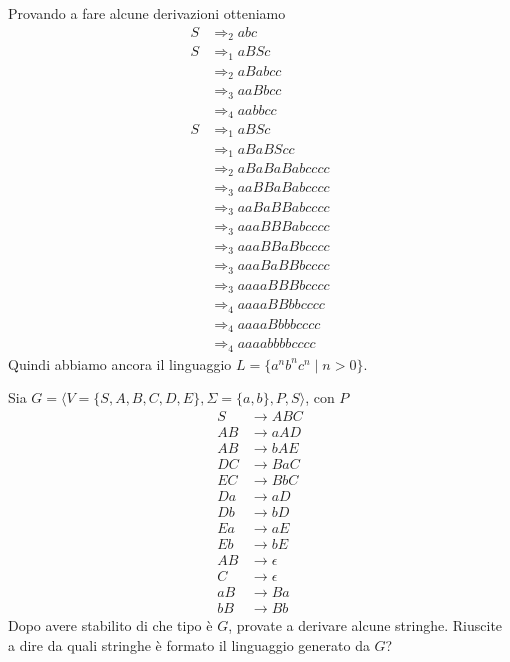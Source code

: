 \documentclass[12pt, answers]{exam}
\begin{document}
\begin{questions}
\begin{solution}
		Provando a fare alcune derivazioni otteniamo
		\begin{align*}
			S &\Rightarrow_2 a b c \\
			S &\Rightarrow_1 a B S c \\
			  &\Rightarrow_2 a B a b c c \\
			  &\Rightarrow_3 a a B b c c \\
			  &\Rightarrow_4 a a b b c c \\
			S &\Rightarrow_1 a B S c \\
			  &\Rightarrow_1 a B a B S c c \\
			  &\Rightarrow_2 a B a B a B a b c c c c \\
			  &\Rightarrow_3 a a B B a B a b c c c c \\
			  &\Rightarrow_3 a a B a B B a b c c c c \\
			  &\Rightarrow_3 a a a B B B a b c c c c \\ 
			  &\Rightarrow_3 a a a B B a B b c c c c \\
			  &\Rightarrow_3 a a a B a B B b c c c c \\
			  &\Rightarrow_3 a a a a B B B b c c c c \\
			  &\Rightarrow_4 a a a a B B b b c c c c \\
			  &\Rightarrow_4 a a a a B b b b c c c c \\
			  &\Rightarrow_4 a a a a b b b b c c c c 
		\end{align*}
		Quindi abbiamo ancora il linguaggio $L = \{ a^nb^nc^n \mid n > 0 \}$.
	\end{solution}
	\question Sia $G = \langle V = \{ S, A, B, C, D, E \}, \Sigma = \{ a, b \}, P, S \rangle$, con $P$
	\begin{align}
		S &\rightarrow A B C \\
		A B &\rightarrow a A D \\
		A B &\rightarrow b A E \\
		D C &\rightarrow B a C \\
		E C &\rightarrow B b C \\
		D a &\rightarrow a D \\
		D b &\rightarrow b D \\
		E a &\rightarrow a E \\
		E b &\rightarrow b E \\
		A B &\rightarrow \epsilon \\
		C   &\rightarrow \epsilon \\
		a B &\rightarrow B a \\
		b B &\rightarrow B b 
	\end{align}
	Dopo avere stabilito di che tipo è $G$, provate a derivare alcune stringhe. Riuscite a dire da quali stringhe è formato il linguaggio generato da $G$?


\end{questions}
\end{document}
